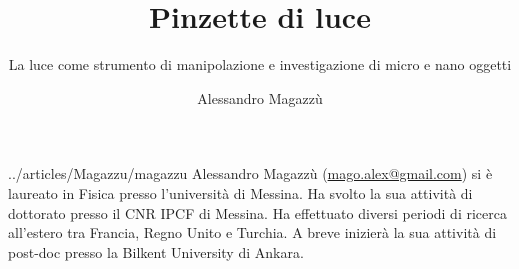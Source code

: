 ﻿\title{Pinzette di luce}
\subtitle{La luce come strumento di manipolazione e investigazione di micro e nano oggetti}
\suptitle{\phantom{x}}
\author{Alessandro Magazzù}
\maketitle
\begin{small}
\pichskip{4mm}
\nobalance



\vfill
\begin{thebiography}{../articles/Magazzu/magazzu}
Alessandro Magazzù (\url{mago.alex@gmail.com}) si è laureato in Fisica presso l'università di Messina. Ha svolto la sua attività di dottorato presso il CNR IPCF di Messina.
Ha effettuato diversi periodi di ricerca all'estero tra Francia, Regno Unito e Turchia. A breve inizierà la sua attività di post-doc presso la Bilkent University di Ankara.
\end{thebiography}
\end{small}

